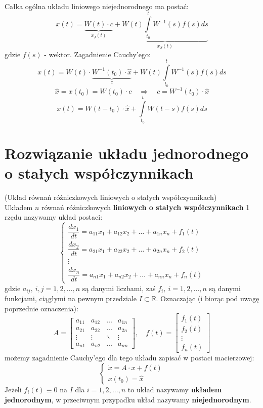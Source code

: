 \begin{tw}
Całka ogólna układu liniowego niejednorodnego ma postać: $$x(t)=\underbrace{W(t)\cdot c}_{x_J(t)} +\underbrace{W(t)\int\limits_{t_0}^tW^{-1}(s)f(s)ds}_{x_S(t)}$$ gdzie $f(s)$ - wektor. Zagadnienie Cauchy'ego: $$x(t)=W(t)\cdot \underbrace{W^{-1}(t_0)\cdot\hat{x}}_{c}+W(t)\int\limits_{t_0}^tW^{-1}(s)f(s)ds$$ $$\hat{x}=x(t_0)=W(t_0)\cdot c\quad\Rightarrow\quad c=W^{-1}(t_0)\cdot\hat{x}$$ $$x(t)=W(t-t_0)\cdot\hat{x}+\int\limits_{t_0}^tW(t-s)f(s)ds$$
\end{tw}

\section{Rozwiązanie układu jednorodnego o stałych współczynnikach}

\begin{df}{(Układ równań różniczkowych liniowych o stałych współczynnikach)}\\
Układem $n$ równań różniczkowych \textbf{liniowych o stałych współczynnikach} 1 rzędu nazywamy układ postaci:
$$\left\{\begin{array}{c}
\dfrac{dx_1}{dt}=a_{11}x_1+a_{12}x_2+\ldots+a_{1n}x_n+f_1(t)\\
\dfrac{dx_2}{dt}=a_{21}x_1+a_{22}x_2+\ldots+a_{2n}x_n+f_2(t)\\
\vdots\\
\dfrac{dx_n}{dt}=a_{n1}x_1+a_{n2}x_2+\ldots+a_{nn}x_n+f_n(t)
\end{array}\right.$$
gdzie $a_{ij},\ i,j=1,2,\ldots,n$ są danymi liczbami, zaś $f_i,\ i=1,2,\ldots,n$ są danymi funkcjami, ciągłymi na pewnym przedziale $I\subset\mathbb{R}$. Oznaczając (i biorąc pod uwagę poprzednie oznaczenia):
$$A=
\begin{bmatrix}
a_{11} & a_{12} & \ldots & a_{1n}\\
a_{21} & a_{22} & \ldots & a_{2n}\\
\vdots & \vdots & \ddots & \vdots\\
a_{n1} & a_{n2} & \ldots & a_{nn}
\end{bmatrix},\quad f(t)=
\begin{bmatrix}
f_1(t)\\
f_2(t)\\
\vdots\\
f_n(t)
\end{bmatrix}$$
możemy zagadnienie Cauchy'ego dla tego układu zapisać w postaci macierzowej:
$$\left\{\begin{array}{l}
\dot{x}=A\cdot x+f(t)\\
x(t_0)=\hat{x}
\end{array}\right.$$
Jeżeli $f_i(t)\equiv 0$ na $I$ dla $i=1,2,\ldots,n$ to układ nazywamy \textbf{układem jednorodnym}, w przeciwnym przypadku układ nazywamy \textbf{niejednorodnym}.
\end{df}

